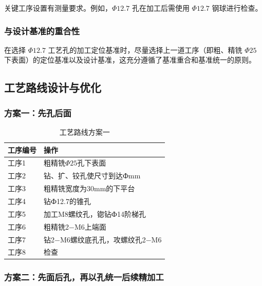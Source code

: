 \documentclass[12pt,a4paper,fontset=none]{ctexart}
\begin{document}
    关键工序设置有测量要求。例如，$\Phi12.7$ 孔在加工后需使用 $\Phi12.7$ 钢球进行检查。

    \subsubsection{与设计基准的重合性}

    在选择 $\Phi12.7$ 工艺孔的加工定位基准时，尽量选择上一道工序（即粗、精铣 $\Phi25$ 下表面）的定位基准以及设计基准，这充分遵循了基准重合和基准统一的原则。

    \subsection{工艺路线设计与优化}

    \subsubsection{方案一：先孔后面}

    \begin{table}[H]
        \centering
        \caption{工艺路线方案一}
        \begin{tabular}{p{2.2cm} p{9.5cm}}
            \toprule
            工序编号 & 操作                  \\
            \midrule
            工序1  & 粗精铣$\Phi25$孔下表面     \\
            工序2  & 钻、扩、铰孔使尺寸到达Фmm      \\
            工序3  & 粗精铣宽度为30mm的下平台      \\
            工序4  & 钻Ф12.7的锥孔           \\
            工序5  & 加工M8螺纹孔，锪钻Ф14阶梯孔    \\
            工序6  & 粗精铣2−M6上端面          \\
            工序7  & 钻2−M6螺纹底孔孔，攻螺纹孔2−M6 \\
            工序8  & 检查                  \\
            \bottomrule
        \end{tabular}\label{tab:table3}
    \end{table}

    \subsubsection{方案二：先面后孔，再以孔统一后续精加工}
\end{document}
